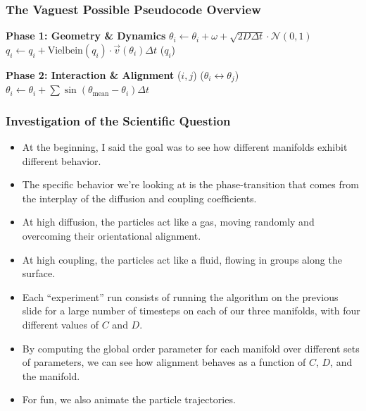 \documentclass{beamer}
\begin{document}
\begin{frame}
    \frametitle{The Vaguest Possible Pseudocode Overview}

    \begin{algorithm}[H]
        \begin{algorithmic}[1]
            \State \textbf{Phase 1: Geometry \& Dynamics}
                \State $\theta_i \gets \theta_i + \omega + \sqrt{2D\Delta t} \cdot \mathcal{N}(0,1)$ 
                \State $q_i \gets q_i + \text{Vielbein}(q_i) \cdot \vec{v}(\theta_i) \Delta t$ 
                \State {}($q_i$) 
            \EndFor
            
            \State \textbf{Phase 2: Interaction \& Alignment}
                    \State {}($i, j$) 
                \EndIf
                \State {}($\theta_i \leftrightarrow \theta_j$) 
                \State $\theta_i \gets \theta_i + \sum \sin(\theta_\text{mean} - \theta_i) \Delta t$ 
            \EndFor
        \EndProcedure
        \end{algorithmic}
    \end{algorithm}

\end{frame}

\begin{frame}
    \frametitle{Investigation of the Scientific Question}

    \begin{itemize}
        \item At the beginning, I said the goal was to see how different manifolds
        exhibit different behavior.
        \item The specific behavior we're looking at is the phase-transition 
        that comes from the interplay of the diffusion and coupling coefficients.
        \item At high diffusion, the particles act like a gas, moving randomly
        and overcoming their orientational alignment.
        \item At high coupling, the particles act like a fluid, flowing in groups
        along the surface.
        \item Each ``experiment'' run consists of running the algorithm
        on the previous slide for a large number of timesteps on each
        of our three manifolds, with four different values of $C$ and $D$.
        \item By computing the global order parameter for each manifold
        over different sets of parameters, we can see how alignment
        behaves as a function of $C$, $D$, and the manifold.
        \item For fun, we also animate the particle trajectories.
    \end{itemize}
\end{frame}
\end{document}
